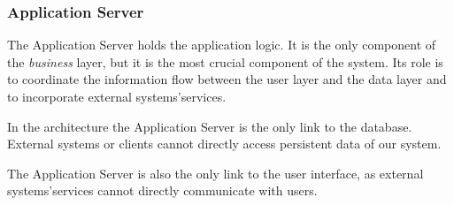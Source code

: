 \documentclass[../DD0.tex]{subfiles}
\begin{document}
      \subsubsection{Application Server}

        The Application Server holds the application logic. It is the only component of the \textit{business} layer, but it is the most crucial component of the system. Its role is to coordinate the information flow between the user layer and the data layer and to incorporate external systems'services.

        In the architecture the Application Server is the only link to the database. External systems or clients cannot directly access persistent data of our system.

        The Application Server is also the only link to the user interface, as external systems'services cannot directly communicate with users.
\end{document}

